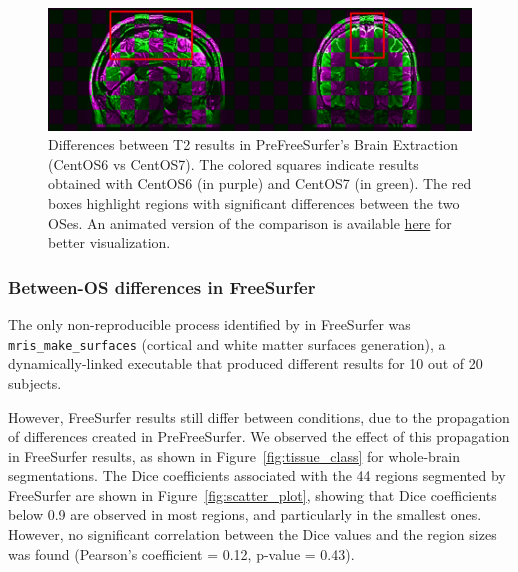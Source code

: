 \begin{figure}
  \centering
    \includegraphics[width=\columnwidth]{chapters/chapter1/figures/t2w_alignment.png}
    \caption{Differences between T2 \fnirt results in PreFreeSurfer's Brain Extraction (CentOS6 vs CentOS7).
    The colored squares indicate results obtained with CentOS6 (in purple) and CentOS7 (in green).
    The red boxes highlight regions with significant differences between the two OSes. 
    An animated version of the comparison is available \href{https://github.com/big-data-lab-team/HCP-reproducibility-paper/blob/master/figures/pfs_t2w_alignment.gif}{here} for better visualization.}
    \label{fig:fnirt_result}
\end{figure}

\subsubsection{Between-OS differences in FreeSurfer}

The only non-reproducible process identified by \toolname in FreeSurfer was
\texttt{mris\_make\_surfaces} (cortical and white matter surfaces
generation), a dynamically-linked executable
that produced different results for
10 out of 20 subjects.

However, FreeSurfer results still differ between conditions, due to the
propagation of differences created in PreFreeSurfer. We
observed the effect of this propagation in FreeSurfer results, as shown in
Figure~\ref{fig:tissue_class} for whole-brain segmentations. The
Dice coefficients associated with the 44 regions segmented by
FreeSurfer are shown in Figure~\ref{fig:scatter_plot}, showing that Dice coefficients below 0.9 are
observed in most regions, and particularly in the smallest ones.
However, no significant correlation between the Dice values and the region sizes was found
(Pearson's coefficient = 0.12, p-value = 0.43).


